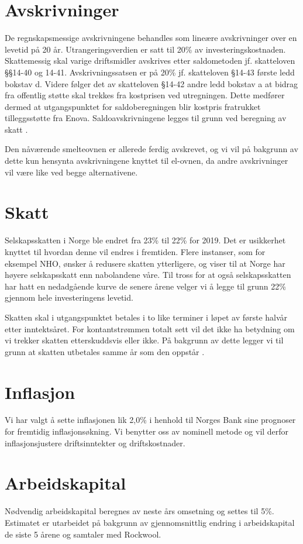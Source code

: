 \section{Avskrivninger}
De regnskapsmessige avskrivningene behandles som lineære avskrivninger over en levetid på 20 år. Utrangeringsverdien er satt til 20\% av investeringskostnaden. Skattemessig skal varige driftsmidler avskrives etter saldometoden jf. skatteloven §§14-40 og 14-41. Avskrivningssatsen er på 20\% jf. skatteloven §14-43 første ledd bokstav d. Videre følger det av skatteloven §14-42 andre ledd bokstav a at bidrag fra offentlig støtte skal trekkes fra kostprisen ved utregningen. Dette medfører dermed at utgangspunktet for saldoberegningen blir kostpris fratrukket tilleggsstøtte fra Enova. Saldoavskrivningene legges til grunn ved beregning av skatt \cite{skatteloven}. 

\indent \newline
Den nåværende smelteovnen er allerede ferdig avskrevet, og vi vil på bakgrunn av dette kun hensynta avskrivningene knyttet til el-ovnen, da andre avskrivninger vil være like ved begge alternativene.

\section{Skatt}
Selskapsskatten i Norge ble endret fra 23\% til 22\% for 2019. Det er usikkerhet knyttet til hvordan denne vil endres i fremtiden. Flere instanser, som for eksempel NHO, ønsker å redusere skatten ytterligere, og viser til at Norge har høyere selskapsskatt enn nabolandene våre. Til tross for at også selskapsskatten har hatt en nedadgående kurve de senere årene velger vi å legge til grunn 22\% gjennom hele investeringens levetid. 

\indent \newline
Skatten skal i utgangspunktet betales i to like terminer i løpet av første halvår etter inntektsåret. For kontantstrømmen totalt sett vil det ikke ha betydning om vi trekker skatten etterskuddsvis eller ikke. På bakgrunn av dette legger vi til grunn at skatten utbetales samme år som den oppstår \cite{skattaksje}.

\section{Inflasjon}
Vi har valgt å sette inflasjonen lik 2,0\% i henhold til Norges Bank sine prognoser for fremtidig inflasjonsøkning. Vi benytter oss av nominell metode og vil derfor inflasjonsjustere driftsinntekter og driftskostnader.

\section{Arbeidskapital}
Nødvendig arbeidskapital beregnes av neste års omsetning og settes til 5\%. Estimatet er utarbeidet på bakgrunn av gjennomsnittlig endring i arbeidskapital de siste 5 årene og samtaler med Rockwool.





 